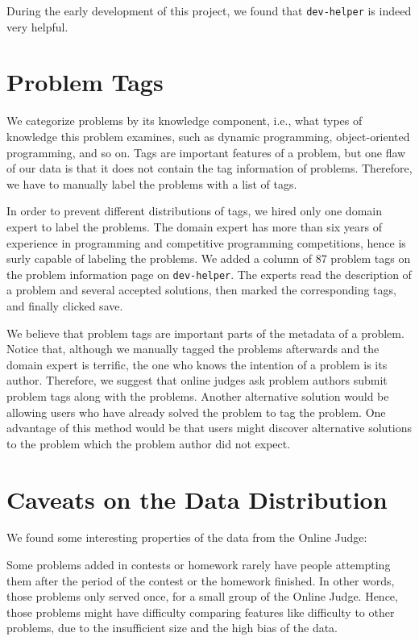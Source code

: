     During the early development of this project, we found that \texttt{dev-helper} is indeed very helpful.

\section{Problem Tags}

    We categorize problems by its knowledge component, i.e., what types of knowledge this problem examines,
    such as dynamic programming, object-oriented programming, and so on.
    Tags are important features of a problem,
    but one flaw of our data is that it does not contain the tag information of problems.
    Therefore, we have to manually label the problems with a list of tags.

    In order to prevent different distributions of tags, we hired only one domain expert to label the problems.
    The domain expert has more than six years of experience in programming and competitive programming competitions,
    hence is surly capable of labeling the problems.
    We added a column of 87 problem tags on the problem information page on \texttt{dev-helper}.
    The experts read the description of a problem and several accepted solutions,
    then marked the corresponding tags, and finally clicked save.

    We believe that problem tags are important parts of the metadata of a problem.
    Notice that, although we manually tagged the problems afterwards and the domain expert is terrific,
    the one who knows the intention of a problem is its author.
    Therefore, we suggest that online judges ask problem authors submit problem tags along with the problems.
    Another alternative solution would be allowing users who have already solved the problem to tag the problem.
    One advantage of this method would be that users might discover alternative solutions to the problem
    which the problem author did not expect.

\section{Caveats on the Data Distribution}

    We found some interesting properties of the data from the Online Judge:

    Some problems added in contests or homework rarely have people attempting them
    after the period of the contest or the homework finished.
    In other words, those problems only served once, for a small group of the Online Judge.
    Hence, those problems might have difficulty comparing features like difficulty to other problems,
    due to the insufficient size and the high bias of the data.

